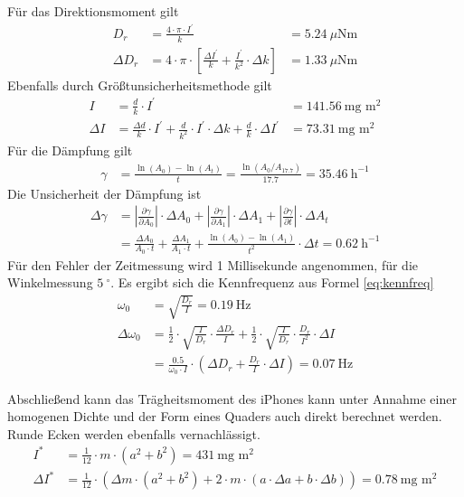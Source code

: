 \documentclass{article}
\begin{document}
Für das Direktionsmoment gilt
\begin{align}
D_r &= \frac{4\cdot\pi\cdot I^\prime}{k} &= 5.24~\mu\text{Nm}\\
\Delta D_r &= 4\cdot\pi\cdot \left[ \frac{\Delta I^\prime}{k} + \frac{I^\prime}{k^2}\cdot \Delta k \right]  &= 1.33~\mu\text{Nm}
\end{align}
Ebenfalls durch Größtunsicherheitsmethode gilt
\begin{align}
I &= \frac{d}{k}\cdot I^\prime  &= 141.56~\text{mg m}^2 \\
\Delta I &= \frac{\Delta d}{k}\cdot I^\prime +\frac{d}{k^2}\cdot I^\prime\cdot \Delta k +\frac{d}{k}\cdot \Delta I^\prime &= 73.31~\text{mg m}^2 
\end{align}
Für die Dämpfung gilt 
\begin{align}
\gamma &= \frac{\ln(A_0) - \ln(A_t)}{t} = \frac{\ln(A_0 / A_{17.7})}{17.7} = 35.46~\text{h}^{-1}
\end{align}
Die Unsicherheit der Dämpfung ist
\begin{align}
\Delta \gamma &= \left| \frac{\partial \gamma}{\partial A_0} \right|\cdot \Delta A_0 + \left| \frac{\partial \gamma}{\partial A_1} \right|\cdot \Delta A_1 + \left| \frac{\partial \gamma}{\partial t} \right|\cdot \Delta A_t \\
&= \frac{\Delta A_0}{A_0 \cdot t} +\frac{\Delta A_1}{A_1 \cdot t} + \frac{\ln(A_0) - \ln(A_1)}{t^2}\cdot \Delta t = 0.62~\text{h}^{-1}
\end{align}
Für den Fehler der Zeitmessung wird 1 Millisekunde angenommen, für die Winkelmessung $5~^\circ$.
Es ergibt sich die Kennfrequenz aus Formel \eqref{eq:kennfreq}
\begin{align}
\omega_0 &= \sqrt{\frac{D_r}{I}}  = 0.19~\text{Hz} \\
\Delta \omega_0 &= \frac{1}{2} \cdot \sqrt{\frac{I}{D_r}} \cdot \frac{\Delta D_r}{I} + \frac{1}{2}\cdot  \sqrt{\frac{I}{D_r}} \cdot \frac{D_r}{I^2}\cdot \Delta I  \\
&= \frac{0.5}{\omega_0 \cdot I} \cdot \left( \Delta D_r + \frac{D_r}{I}\cdot \Delta I \right) = 0.07~\text{Hz}
\end{align}


Abschließend kann das Trägheitsmoment des iPhones kann unter Annahme einer homogenen Dichte und der Form eines Quaders auch direkt berechnet werden. Runde Ecken werden ebenfalls vernachlässigt.
\begin{align*}
I^* &= \frac{1}{12}\cdot m \cdot (a^2 + b^2) = 431~\text{mg m}^2 \\
\Delta I^* &= \frac{1}{12}\cdot \left( \Delta m \cdot (a^2 + b^2) + 2\cdot m \cdot (a\cdot \Delta a + b \cdot \Delta b)  \right) = 0.78~\text{mg m}^2
\end{align*}
\end{document}

